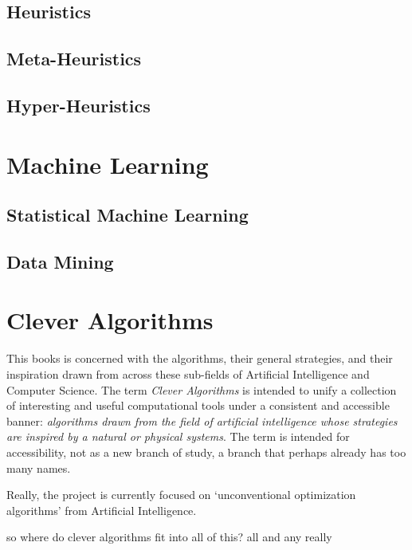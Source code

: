 \documentclass[a4paper, 11pt]{article}
\begin{document}
\subsection{Heuristics}

\subsection{Meta-Heuristics}

\subsection{Hyper-Heuristics}


% 
% 
\section{Machine Learning}
\label{sec:machine_learning}

\subsection{Statistical Machine Learning}

\subsection{Data Mining}

% 
% 
\section{Clever Algorithms}
\label{sec:clever_algorithms}
This books is concerned with the algorithms, their general strategies, and their inspiration drawn from across these sub-fields of Artificial Intelligence and Computer Science. The term \emph{Clever Algorithms} is intended to unify a collection of interesting and useful computational tools under a consistent and accessible banner: \emph{algorithms drawn from the field of artificial intelligence whose strategies are inspired by a natural or physical systems}. The term is intended for accessibility, not as a new branch of study, a branch that perhaps already has too many names.

Really, the project is currently focused on `unconventional optimization algorithms' from Artificial Intelligence.

so where do clever algorithms fit into all of this?
all and any really






\end{document}

